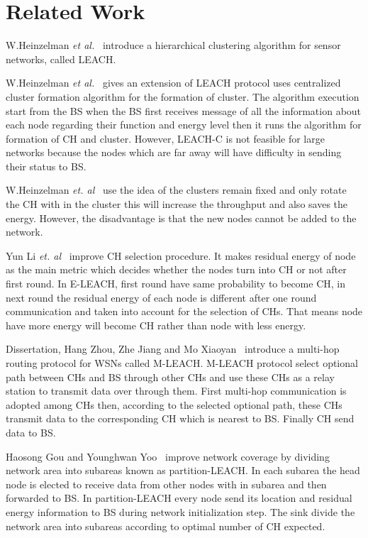 \documentclass[journal]{IEEEtran}
\begin{document}
\section{Related Work}
W.Heinzelman \textit{et al.}~\cite{R6} introduce a hierarchical clustering algorithm for sensor networks, called LEACH.

W.Heinzelman \textit{et al.}~\cite{R7} gives an extension of LEACH protocol uses centralized cluster formation algorithm for the formation of cluster. The algorithm execution start from the BS when the BS first receives message of all the information about each node regarding their function and energy level then it runs the algorithm for formation of CH and cluster. However, LEACH-C is not feasible for large networks because the nodes which are far away will have difficulty in sending their status to BS.

W.Heinzelman \textit{et. al}~\cite{R7} use the idea of the  clusters remain fixed and only rotate the CH with in the cluster this will increase the throughput and also saves the energy. However, the disadvantage is that the new nodes cannot be added to the network.

Yun Li \textit{et. al}~\cite{R8} improve CH selection procedure. It makes residual energy of node as the main metric which decides whether the nodes turn into CH or not after first round. In E-LEACH, first round have same probability to become CH, in next round the residual energy of each node is different after one round communication and taken into account for the selection of CHs. That means node have more energy will become CH rather than node with less energy.

Dissertation, Hang Zhou, Zhe Jiang and Mo Xiaoyan~\cite{R9} introduce a multi-hop routing protocol for WSNs called M-LEACH. M-LEACH protocol select optional path between CHs and BS through other CHs and use these CHs as a relay station to transmit data over through them. First multi-hop communication is adopted among CHs then, according to the selected optional path, these CHs transmit data to the corresponding CH which is nearest to BS. Finally CH send data to BS.

Haosong Gou and Younghwan Yoo~\cite{R10} improve network coverage by dividing network area into subareas known as partition-LEACH. In each subarea the head node is elected to receive data from other nodes with in subarea and then forwarded to BS. In partition-LEACH every node send its location and residual energy information to BS during network initialization step. The sink divide the network area into subareas according to optimal number of CH expected.
\end{document}

